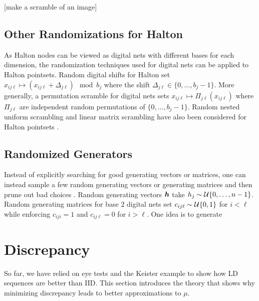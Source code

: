 \documentclass{svproc}
\begin{document}
[make a scramble of an image]

\subsection{Other Randomizations for Halton}

As Halton nodes can be viewed as digital nets with different bases for each dimension, the randomization techniques used for digital nets can be applied to Halton pointsets. Random digital shifts for Halton set $x_{ij\ell} \mapsto (x_{ij\ell} + \Delta_{j\ell}) \mod b_j$ where the shift $\Delta_{j\ell} \in \{0,\dots,b_j-1\}$. More generally, a permutation scramble for digital nets sets $x_{ij\ell} \mapsto \Pi_{j\ell}(x_{ij\ell})$ where $\Pi_{j\ell}$ are independent random permutations of $\{0,\dots,b_j-1\}$. Random nested uniform scrambling and linear matrix scrambling have also been considered for Halton pointsets \cite{owen2024gain}. 

\subsection{Randomized Generators}

Instead of explicitly searching for good generating vectors or matrices, one can instead sample a few random generating vectors or generating matrices and then prune out bad choices \cite{}.  Random generating vectors ${\boldsymbol{h}}$ take $h_j \sim {\mathcal{U}}\{0,\dots,n-1\}$. Random generating matrices for base $2$ digital nets set $c_{ij\ell} \sim {\mathcal{U}}\{0,1\}$ for $i<\ell$ while enforcing $c_{iji}=1$ and $c_{ij\ell}=0$ for $i>\ell$. One idea is to generate 

\section{Discrepancy} \label{sec:discrepancy}
So far, we have relied on eye tests and the Keister example to show how LD sequences are better than IID.  This section introduces the theory that shows why minimizing discrepancy leads to better approximations to $\mu$.
\end{document}
